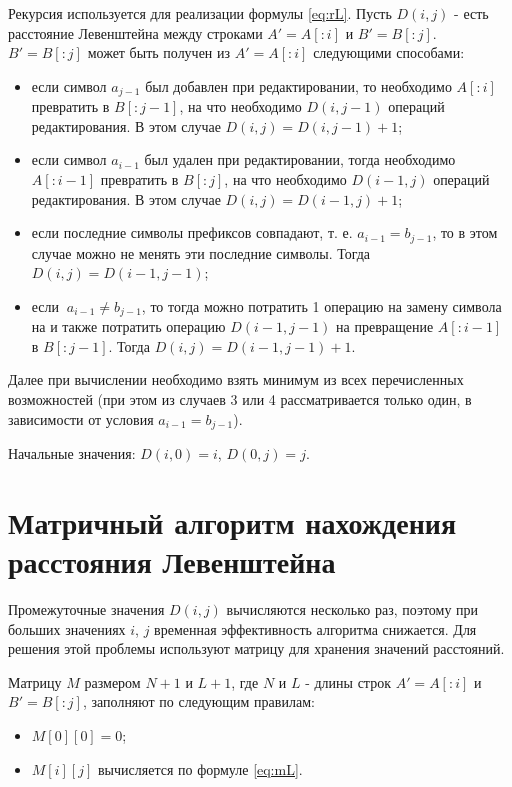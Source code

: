 Рекурсия используется для реализации формулы \ref{eq:rL}. Пусть $D(i,j)$ - есть расстояние Левенштейна между строками $A'= A[:i]$ и $B' = B[:j]$. $B' = B[:j]$ может быть получен из $A'= A[:i]$ следующими способами:

\begin{itemize}
	\item если символ $a_{j-1}$ был добавлен при редактировании, то необходимо $A[:i]$ превратить в $B[:j-1]$, на что необходимо $D(i,j-1)$ операций редактирования. В этом случае $D(i,j) = D(i,j-1) + 1$;
	\item если символ $a_{i-1}$ был удален при редактировании, тогда необходимо $A[:i-1]$ превратить в $B[:j]$, на что необходимо $D(i-1,j)$ операций редактирования. В этом случае $D(i,j) = D(i-1,j) + 1$;
	\item если последние символы префиксов совпадают, т. е. $a_{i-1} = b_{j-1}$, то в этом случае можно не менять эти последние символы. Тогда $D(i,j) = D(i-1,j-1)$;
	\item если $\medspace a_{i-1} \neq b_{j-1}$, то тогда можно потратить 1 операцию на замену символа  на и также потратить  операцию $D(i-1,j-1)$ на превращение $A[:i-1]$ в $B[:j-1]$. Тогда $D(i,j) = D(i-1,j-1) + 1$.
\end{itemize}

Далее при вычислении  необходимо взять минимум из всех перечисленных возможностей (при этом из случаев 3 или 4 рассматривается только один, в зависимости от условия $a_{i-1} = b_{j-1}$).

Начальные значения: $D(i,0) = i$, $D(0,j) = j$.

\section{Матричный алгоритм нахождения расстояния Левенштейна}

Промежуточные значения $D(i,j)$ вычисляются несколько раз, поэтому при больших значениях $i$, $j$ временная эффективность алгоритма снижается. Для решения этой проблемы используют матрицу для хранения значений расстояний.

Матрицу $M$ размером $N+1$ и $L+1$, где $N$ и $L$ - длины строк $A'= A[:i]$ и $B' = B[:j]$, заполняют по следующим правилам:

\begin{itemize}
	\item $M[0][0] = 0$;
	\item $M[i][j]$ вычисляется по формуле \ref{eq:mL}.
\end{itemize}

